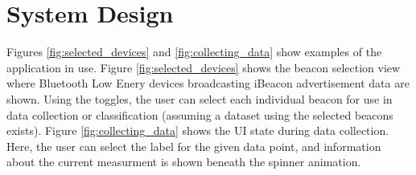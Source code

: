 \chapter{System Design}\label{chap:system_design}





Figures \ref{fig:selected_devices} and \ref{fig:collecting_data} show examples of the application in use. 
Figure \ref{fig:selected_devices} shows the beacon selection view where Bluetooth Low Enery devices broadcasting iBeacon advertisement data are shown.
Using the toggles, the user can select each individual beacon for use in data collection or classification (assuming a dataset using the selected beacons exists).
Figure \ref{fig:collecting_data} shows the UI state during data collection.
Here, the user can select the label for the given data point, and information about the current measurment is shown beneath the spinner animation.


